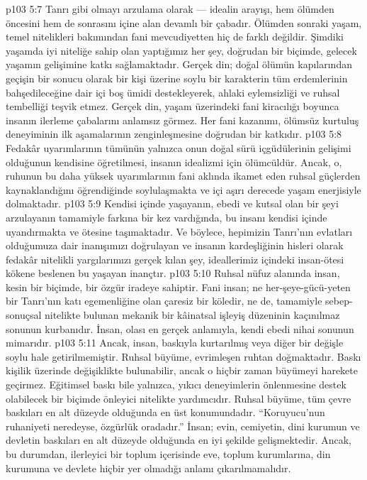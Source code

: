 \vs p103 5:7 Tanrı gibi olmayı arzulama olarak --- idealin arayışı, hem ölümden öncesini hem de sonrasını içine alan devamlı bir çabadır. Ölümden sonraki yaşam, temel nitelikleri bakımından fani mevcudiyetten hiç de farklı değildir. Şimdiki yaşamda iyi niteliğe sahip olan yaptığımız her şey, doğrudan bir biçimde, gelecek yaşamın gelişimine katkı sağlamaktadır. Gerçek din; doğal ölümün kapılarından geçişin bir sonucu olarak bir kişi üzerine soylu bir karakterin tüm erdemlerinin bahşedileceğine dair içi boş ümidi destekleyerek, ahlaki eylemsizliği ve ruhsal tembelliği teşvik etmez. Gerçek din, yaşam üzerindeki fani kiracılığı boyunca insanın ilerleme çabalarını anlamsız görmez. Her fani kazanımı, ölümsüz kurtuluş deneyiminin ilk aşamalarının zenginleşmesine doğrudan bir katkıdır.
\vs p103 5:8 Fedakâr uyarımlarının tümünün yalnızca onun doğal sürü içgüdülerinin gelişimi olduğunun kendisine öğretilmesi, insanın idealizmi için ölümcüldür. Ancak, o, ruhunun bu daha yüksek uyarımlarının fani aklında ikamet eden ruhsal güçlerden kaynaklandığını öğrendiğinde soylulaşmakta ve içi aşırı derecede yaşam enerjisiyle dolmaktadır.
\vs p103 5:9 Kendisi içinde yaşayanın, ebedi ve kutsal olan bir şeyi arzulayanın tamamiyle farkına bir kez vardığında, bu insanı kendisi içinde uyandırmakta ve ötesine taşımaktadır. Ve böylece, hepimizin Tanrı’nın evlatları olduğumuza dair inanışımızı doğrulayan ve insanın kardeşliğinin hisleri olarak fedakâr nitelikli yargılarımızı gerçek kılan şey, ideallerimiz içindeki insan\hyp{}ötesi kökene beslenen bu yaşayan inançtır.
\vs p103 5:10 Ruhsal nüfuz alanında insan, kesin bir biçimde, bir özgür iradeye sahiptir. Fani insan; ne her\hyp{}şeye\hyp{}gücü\hyp{}yeten bir Tanrı’nın katı egemenliğine olan çaresiz bir köledir, ne de, tamamiyle sebep\hyp{}sonuçsal nitelikte bulunan mekanik bir kâinatsal işleyiş düzeninin kaçınılmaz sonunun kurbanıdır. İnsan, olası en gerçek anlamıyla, kendi ebedi nihai sonunun mimarıdır.
\vs p103 5:11 Ancak, insan, baskıyla kurtarılmış veya diğer bir değişle soylu hale getirilmemiştir. Ruhsal büyüme, evrimleşen ruhtan doğmaktadır. Baskı kişilik üzerinde değişiklikte bulunabilir, ancak o hiçbir zaman büyümeyi harekete geçirmez. Eğitimsel baskı bile yalnızca, yıkıcı deneyimlerin önlenmesine destek olabilecek bir biçimde önleyici nitelikte yardımcıdır. Ruhsal büyüme, tüm çevre baskıları en alt düzeyde olduğunda en üst konumundadır. “Koruyucu’nun ruhaniyeti neredeyse, özgürlük oradadır.” İnsan; evin, cemiyetin, dini kurumun ve devletin baskıları en alt düzeyde olduğunda en iyi şekilde gelişmektedir. Ancak, bu durumdan, ilerleyici bir toplum içerisinde eve, toplum kurumlarına, din kurumuna ve devlete hiçbir yer olmadığı anlamı çıkarılmamalıdır.

